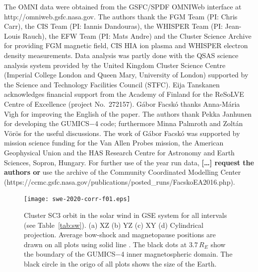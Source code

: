 \documentclass[linenumbers,draft]{agujournal}
\begin{document}
\begin{acknowledgments}
The OMNI data were obtained from the GSFC/SPDF OMNIWeb interface at http://omniweb.gsfc.nasa.gov. The authors thank the FGM Team (PI: Chris Carr), the CIS Team (PI: Iannis Dandouras), the WHISPER Team (PI: Jean-Louis Rauch), the EFW Team (PI: Mats Andre) and the Cluster Science Archive for providing FGM magnetic field, CIS HIA ion plasma and WHISPER electron density measurements. Data analysis was partly done with the QSAS science analysis system provided by the United Kingdom Cluster Science Centre (Imperial College London and Queen Mary, University of London) supported by the Science and Technology Facilities Council (STFC). Eija Tanskanen acknowledges financial support from the Academy of Finland for the ReSoLVE Centre of Excellence (project No.~272157). G{\'a}bor Facsk{\'o} thanks Anna-M\'aria V\'\i gh for improving the English of the paper. The authors thank Pekka Janhunen for developing the GUMICS$-$4 code; furthermore Minna Palmroth and Zolt{\'a}n V{\"o}r{\"o}s for the useful discussions. The work of G{\'a}bor Facsk{\'o} was supported by mission science funding for the Van Allen Probes mission, the American Geophysical Union and the HAS Research Centre for Astronomy and Earth Sciences, Sopron, Hungary. For further use of the year run data, \textbf{[\dots] request the authors or} use the archive of the Community Coordinated Modelling Center (https://ccmc.gsfc.nasa.gov/publications/posted\_runs/FacskoEA2016.php).
\end{acknowledgments}






\pagebreak

\begin{figure}[h]
\centering
\texttt{[image: swe-2020-corr-f01.eps]}  
\caption{Cluster SC3 orbit in the solar wind in GSE system for all intervals  (see Table~\ref{tab:sw}). (a) XZ (b) YZ (c) XY (d) Cylindrical projection. Average bow-shock and magnetopause positions are drawn on all plots using solid line \citep[][respectively]{peredo95:_three_alfven_mach,tsyganenko95:_model_earth}. The black dots at $3.7\,R_E$ show the boundary of the GUMICS$-$4 inner magnetospheric domain. The black circle in the origo of all plots shows the size of the Earth.}
\label{fig:sworbit}
\end{figure}

\pagebreak
\end{document}
